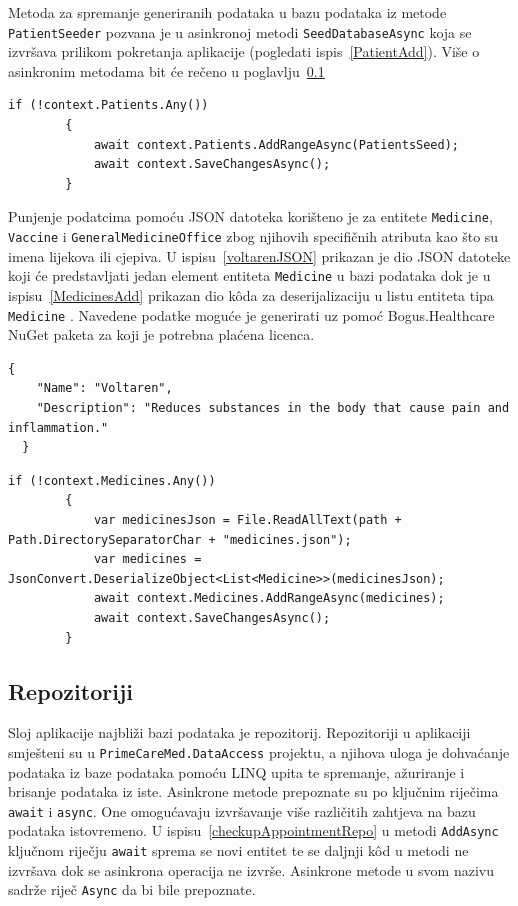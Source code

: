 Metoda za spremanje generiranih podataka u bazu podataka iz metode \texttt{PatientSeeder} pozvana je u asinkronoj metodi \texttt{SeedDatabaseAsync} koja se izvršava prilikom pokretanja aplikacije (pogledati ispis~\ref{PatientAdd}). Više o asinkronim metodama bit će rečeno u poglavlju~\ref{subsec:repo}

\begin{lstlisting}[caption={\texttt{AddRangeAsync} metoda za spremanje generiranih podataka}, label=PatientAdd]
if (!context.Patients.Any())
        {
            await context.Patients.AddRangeAsync(PatientsSeed);
            await context.SaveChangesAsync();
        }
\end{lstlisting}

Punjenje podatcima pomoću JSON datoteka korišteno je za entitete \texttt{Medicine}, \texttt{Vaccine} i \texttt{GeneralMedicineOffice} zbog njihovih specifičnih atributa kao što su imena lijekova ili cjepiva. U ispisu~\ref{voltarenJSON} prikazan je dio JSON datoteke koji će predstavljati jedan element entiteta \texttt{Medicine} u bazi podataka dok je u ispisu~\ref{MedicinesAdd} prikazan dio k\^oda za deserijalizaciju u listu entiteta tipa \texttt{Medicine} . Navedene podatke moguće je generirati uz pomoć Bogus.Healthcare NuGet paketa za koji je potrebna plaćena licenca.

\begin{lstlisting}[caption={Dio JSON datoteke koji će predstavljati jedan element entiteta \texttt{Medicine} u bazi podataka}, label=voltarenJSON]
  {
    "Name": "Voltaren",
    "Description": "Reduces substances in the body that cause pain and inflammation."
  }
\end{lstlisting}

\begin{lstlisting}[caption={Punjenje tablice \texttt{Medicine} podatcima iz JSON datoteke}, label=MedicinesAdd]
        if (!context.Medicines.Any())
        {
            var medicinesJson = File.ReadAllText(path + Path.DirectorySeparatorChar + "medicines.json");
            var medicines = JsonConvert.DeserializeObject<List<Medicine>>(medicinesJson);
            await context.Medicines.AddRangeAsync(medicines);
            await context.SaveChangesAsync();
        }
\end{lstlisting}

\subsection{Repozitoriji}
\label{subsec:repo}
Sloj aplikacije najbliži bazi podataka je repozitorij. Repozitoriji u aplikaciji smješteni su u \texttt{PrimeCareMed.DataAccess} projektu, a njihova uloga je dohvaćanje podataka iz baze podataka pomoću LINQ upita te spremanje, ažuriranje i brisanje podataka iz iste. Asinkrone metode prepoznate su po ključnim riječima \texttt{await} i \texttt{async}. One omogućavaju izvršavanje više različitih zahtjeva na bazu podataka istovremeno. U ispisu~\ref{checkupAppointmentRepo} u metodi \texttt{AddAsync} ključnom riječju \texttt{await} sprema se novi entitet te se daljnji k\^od u metodi ne izvršava dok se asinkrona operacija ne izvrše. Asinkrone metode u svom nazivu sadrže riječ \texttt{Async} da bi bile prepoznate. \cite{linq}

